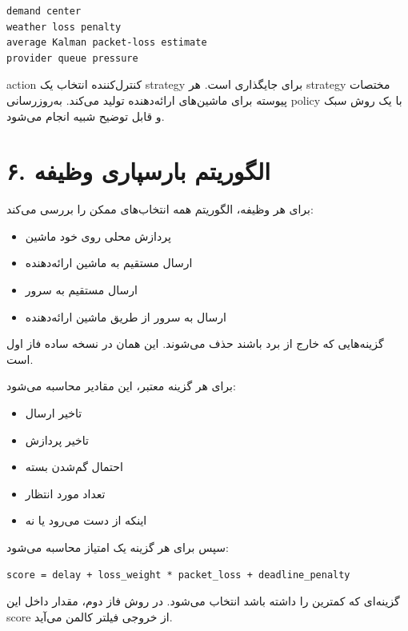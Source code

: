 \documentclass[12pt]{exam}
\begin{document}
\begin{questions}
\begin{latin}
\begin{lstlisting}
demand center
weather loss penalty
average Kalman packet-loss estimate
provider queue pressure
\end{lstlisting}
\end{latin}

action کنترل‌کننده انتخاب یک strategy برای جایگذاری است. هر strategy مختصات
پیوسته برای ماشین‌های ارائه‌دهنده تولید می‌کند. به‌روزرسانی policy با یک روش
سبک و قابل توضیح شبیه  انجام می‌شود.

\section*{۶. الگوریتم بارسپاری وظیفه}
برای هر وظیفه، الگوریتم همه انتخاب‌های ممکن را بررسی می‌کند:

\begin{itemize}
\item پردازش محلی روی خود ماشین
\item ارسال مستقیم به ماشین ارائه‌دهنده
\item ارسال مستقیم به سرور 
\item ارسال به سرور  از طریق ماشین ارائه‌دهنده
\end{itemize}

گزینه‌هایی که خارج از برد باشند حذف می‌شوند. این همان  در
نسخه ساده فاز اول است.

برای هر گزینه معتبر، این مقادیر محاسبه می‌شود:

\begin{itemize}
\item تاخیر ارسال
\item تاخیر پردازش
\item احتمال گم‌شدن بسته
\item تعداد مورد انتظار 
\item اینکه  از دست می‌رود یا نه
\end{itemize}

سپس برای هر گزینه یک امتیاز محاسبه می‌شود:

\begin{latin}
\begin{lstlisting}
score = delay + loss_weight * packet_loss + deadline_penalty
\end{lstlisting}
\end{latin}

گزینه‌ای که کمترین  را داشته باشد انتخاب می‌شود. در روش فاز دوم، مقدار
 داخل این score از خروجی فیلتر کالمن می‌آید.


\end{questions}
\end{document}
